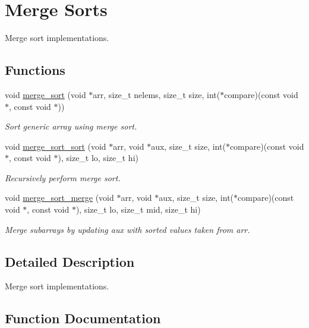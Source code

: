\hypertarget{group__MergeSort}{}\section{Merge Sorts}
\label{group__MergeSort}


Merge sort implementations.  


\subsection*{Functions}
\begin{DoxyCompactItemize}
\item 
void \hyperlink{group__MergeSort_ga9e7f6cf0117297b84135e76a00711d82}{merge\+\_\+sort} (void $\ast$arr, size\+\_\+t nelems, size\+\_\+t size, int($\ast$compare)(const void $\ast$, const void $\ast$))
\begin{DoxyCompactList}\small\item\em Sort generic array using merge sort. \end{DoxyCompactList}\item 
void \hyperlink{group__MergeSort_ga04476f6fd4b5920aab75a4f58c0d9af1}{merge\+\_\+sort\+\_\+sort} (void $\ast$arr, void $\ast$aux, size\+\_\+t size, int($\ast$compare)(const void $\ast$, const void $\ast$), size\+\_\+t lo, size\+\_\+t hi)
\begin{DoxyCompactList}\small\item\em Recursively perform merge sort. \end{DoxyCompactList}\item 
void \hyperlink{group__MergeSort_ga1b4d8f0a083e4f0d30291ce8829ba6fe}{merge\+\_\+sort\+\_\+merge} (void $\ast$arr, void $\ast$aux, size\+\_\+t size, int($\ast$compare)(const void $\ast$, const void $\ast$), size\+\_\+t lo, size\+\_\+t mid, size\+\_\+t hi)
\begin{DoxyCompactList}\small\item\em Merge subarrays by updating aux with sorted values taken from arr. \end{DoxyCompactList}\end{DoxyCompactItemize}


\subsection{Detailed Description}
Merge sort implementations. 



\subsection{Function Documentation}
\mbox{\label{group__MergeSort_ga9e7f6cf0117297b84135e76a00711d82}} 
